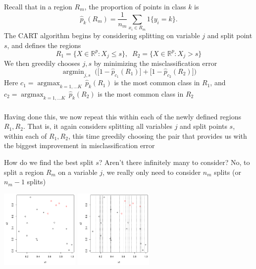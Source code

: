 \documentclass[mathserif]{beamer}
\newcommand{\argmax}{\mathop{\mathrm{argmax}}}
\newcommand{\argmin}{\mathop{\mathrm{argmin}}}
\def\R{\mathds{R}}
\def\red{\color[rgb]{0.8,0,0}}
\begin{document}
\begin{frame}
\frametitle{}
Recall that in a region $R_m$, the proportion of points in class $k$ is
$$\hat{p}_k(R_m) = \frac{1}{n_m} \sum_{x_i \in R_m} 1\{y_i=k\}.$$
The CART algorithm begins by considering splitting on variable $j$ and split 
point $s$, and defines the regions
$$R_1 = \{X \in \R^p : X_j \leq s\}, \;\;
R_2 = \{X \in \R^p : X_j > s\}$$
We then {\red greedily} chooses $j,s$ by minimizing the misclassification error
$$\argmin_{j,s} \; \Big( \big[1-\hat{p}_{c_1}(R_1)\big] + 
\big[1-\hat{p}_{c_2}(R_2)\big] \Big)$$
Here $c_1 = \argmax_{k=1,\ldots K} \, \hat{p}_k(R_1)$ is the most common class
in $R_1$, and $c_2 = \argmax_{k=1,\ldots K} \, \hat{p}_k(R_2)$ is the most 
common class in $R_2$
\end{frame}

\begin{frame}
\frametitle{}
\smallskip
\bigskip
Having done this, we now repeat this within each of the newly defined
regions $R_1,R_2$. That is, it again considers splitting all variables $j$ and
split points $s$,  within each of $R_1,R_2$, this time greedily choosing the pair 
that provides us with the biggest {\red improvement} in misclassification error

\bigskip
How do we find the best split $s$? Aren't there {\red infinitely many} to consider?
No, to split a region $R_m$ on a variable $j$, we really only need to consider $n_m$ 
splits (or $n_m-1$ splits)

\smallskip
\begin{center}
\includegraphics[width=1.5in]{split1.pdf}
\includegraphics[width=1.5in]{split2.pdf}
\end{center}
\end{frame}
\end{document}

